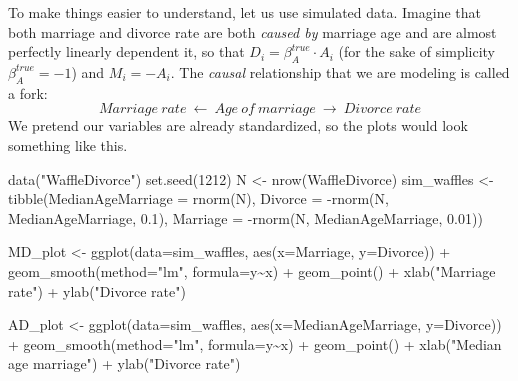 \documentclass[
]{book}
\newenvironment{Shaded}{\begin{snugshade}}{\end{snugshade}}
\newcommand{\AttributeTok}[1]{\textcolor[rgb]{0.77,0.63,0.00}{#1}}
\newcommand{\DecValTok}[1]{\textcolor[rgb]{0.00,0.00,0.81}{#1}}
\newcommand{\FloatTok}[1]{\textcolor[rgb]{0.00,0.00,0.81}{#1}}
\newcommand{\FunctionTok}[1]{\textcolor[rgb]{0.00,0.00,0.00}{#1}}
\newcommand{\NormalTok}[1]{#1}
\newcommand{\OtherTok}[1]{\textcolor[rgb]{0.56,0.35,0.01}{#1}}
\newcommand{\SpecialCharTok}[1]{\textcolor[rgb]{0.00,0.00,0.00}{#1}}
\newcommand{\StringTok}[1]{\textcolor[rgb]{0.31,0.60,0.02}{#1}}
\begin{document}
To make things easier to understand, let us use simulated data. Imagine that both marriage and divorce rate are both \emph{caused by} marriage age and are almost perfectly linearly dependent it, so that \(D_i = \beta_A^{true} \cdot A_i\) (for the sake of simplicity \(\beta_A^{true} = -1\)) and \(M_i = -A_i\). The \emph{causal} relationship that we are modeling is called a fork:
\[Marriage~rate~\leftarrow~Age~of~marriage~\rightarrow~Divorce~rate\]
We pretend our variables are already standardized, so the plots would look something like this.

\begin{Shaded}
\begin{Highlighting}[]
\FunctionTok{data}\NormalTok{(}\StringTok{"WaffleDivorce"}\NormalTok{)}
\FunctionTok{set.seed}\NormalTok{(}\DecValTok{1212}\NormalTok{)}
\NormalTok{N }\OtherTok{\textless{}{-}} \FunctionTok{nrow}\NormalTok{(WaffleDivorce)}
\NormalTok{sim\_waffles }\OtherTok{\textless{}{-}} \FunctionTok{tibble}\NormalTok{(}\AttributeTok{MedianAgeMarriage =} \FunctionTok{rnorm}\NormalTok{(N),}
                      \AttributeTok{Divorce =} \SpecialCharTok{{-}}\FunctionTok{rnorm}\NormalTok{(N, MedianAgeMarriage, }\FloatTok{0.1}\NormalTok{),}
                      \AttributeTok{Marriage =} \SpecialCharTok{{-}}\FunctionTok{rnorm}\NormalTok{(N, MedianAgeMarriage, }\FloatTok{0.01}\NormalTok{))}

\NormalTok{MD\_plot }\OtherTok{\textless{}{-}} 
  \FunctionTok{ggplot}\NormalTok{(}\AttributeTok{data=}\NormalTok{sim\_waffles, }\FunctionTok{aes}\NormalTok{(}\AttributeTok{x=}\NormalTok{Marriage, }\AttributeTok{y=}\NormalTok{Divorce)) }\SpecialCharTok{+} 
  \FunctionTok{geom\_smooth}\NormalTok{(}\AttributeTok{method=}\StringTok{"lm"}\NormalTok{, }\AttributeTok{formula=}\NormalTok{y}\SpecialCharTok{\textasciitilde{}}\NormalTok{x) }\SpecialCharTok{+} 
  \FunctionTok{geom\_point}\NormalTok{() }\SpecialCharTok{+} 
  \FunctionTok{xlab}\NormalTok{(}\StringTok{"Marriage rate"}\NormalTok{) }\SpecialCharTok{+} 
  \FunctionTok{ylab}\NormalTok{(}\StringTok{"Divorce rate"}\NormalTok{)}

\NormalTok{AD\_plot }\OtherTok{\textless{}{-}} 
  \FunctionTok{ggplot}\NormalTok{(}\AttributeTok{data=}\NormalTok{sim\_waffles, }\FunctionTok{aes}\NormalTok{(}\AttributeTok{x=}\NormalTok{MedianAgeMarriage, }\AttributeTok{y=}\NormalTok{Divorce)) }\SpecialCharTok{+} 
  \FunctionTok{geom\_smooth}\NormalTok{(}\AttributeTok{method=}\StringTok{"lm"}\NormalTok{, }\AttributeTok{formula=}\NormalTok{y}\SpecialCharTok{\textasciitilde{}}\NormalTok{x) }\SpecialCharTok{+} 
  \FunctionTok{geom\_point}\NormalTok{() }\SpecialCharTok{+} 
  \FunctionTok{xlab}\NormalTok{(}\StringTok{"Median age marriage"}\NormalTok{) }\SpecialCharTok{+} 
  \FunctionTok{ylab}\NormalTok{(}\StringTok{"Divorce rate"}\NormalTok{)}


\end{Highlighting}
\end{Shaded}
\end{document}
